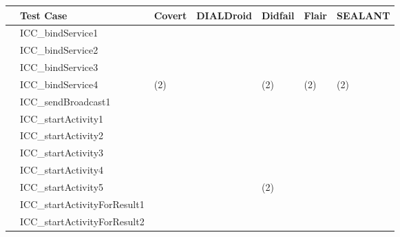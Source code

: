 \documentclass[twocolumn]{article}
\begin{document}
			
	\begin{table*}[hb]
\newcommand{\tp}{\textbf{\normalsize{\textcolor{trueColor}{\CheckedBox}}}}
\newcommand{\fp}{\normalsize{\textcolor{falseColor}{\XBox}}}
\newcommand{\fn}{\normalsize{\textcolor{falseColor}{\Square}}}


\scriptsize
\centering
	\vspace{+0.3cm}
	\begin{tabular}{|p{0.07cm}|l|l|l|l|l|p{1.3cm}|}
		\hline
		& Test Case & Covert & DIALDroid &  Didfail & Flair & SEALANT \\ %
		\hline
		\hline
		\parbox[t]{2mm}{}
		&ICC\_bindService1    &\tp &\tp &\fp \fn	 &\tp	&\tp		\\
		&ICC\_bindService2    &\tp &\fn	&\fn &\tp &\tp			\\
		&ICC\_bindService3    &\tp &\fn	&\fn &\tp &\tp			\\
		&ICC\_bindService4    &\scriptsize (\tp \scriptsize 2)	&\tp \fn &\fp \scriptsize (\fn \scriptsize 2) &\scriptsize (\tp \scriptsize 2)	 &\scriptsize (\tp \scriptsize 2)	\\
		&ICC\_sendBroadcast1  &\tp &\tp &\tp &\tp &\tp \\
		&ICC\_startActivity1  &\tp &\tp &\fn &\tp &\fn \\
		&ICC\_startActivity2  &\tp	&\tp	&\fn	&\tp &\tp \\
		&ICC\_startActivity3  &\tp	&\tp	&\fn	&\tp &\tp \\
		&ICC\_startActivity4  & 	&	&\fp &	& 	\\
		&ICC\_startActivity5  &	&	&\scriptsize (\fp \scriptsize 2) & &	\\
		&ICC\_startActivityForResult1 	&\tp	&\tp &\fn &\tp	&\tp\\
		&ICC\_startActivityForResult2 &\tp &\tp &\fn &\tp &\tp\\

\end{tabular}
\end{table*}
\end{document}
